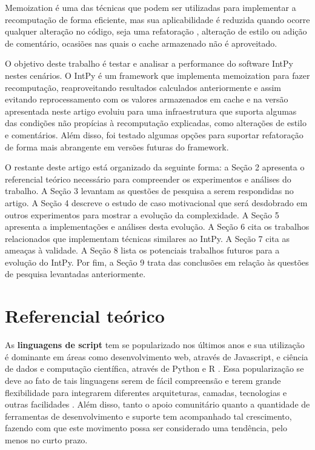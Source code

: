 \documentclass[sigconf]{acmart}
\begin{document}
Memoization \cite{michie1968memo} é uma das técnicas que podem ser utilizadas para implementar a recomputação de forma eficiente, mas sua aplicabilidade é reduzida quando ocorre qualquer alteração no código, seja uma refatoração \cite{fowler2018refactoring}, alteração de estilo ou adição de comentário, ocasiões nas quais o cache armazenado não é aproveitado.

O objetivo deste trabalho é testar e analisar a performance do software IntPy nestes cenários. O IntPy é um framework que implementa memoization para fazer recomputação, reaproveitando resultados calculados anteriormente e assim evitando reprocessamento com os valores armazenados em cache e na versão apresentada neste artigo evoluiu para uma infraestrutura que suporta algumas das condições não propícias à recomputação explicadas, como alterações de estilo e comentários. Além disso, foi testado algumas opções para suportar refatoração de forma mais abrangente em versões futuras do framework.

O restante deste artigo está organizado da seguinte forma: a Seção 2 apresenta o referencial teórico necessário para compreender os experimentos e análises do trabalho. A Seção 3 levantam as questões de pesquisa a serem respondidas no artigo. A Seção 4 descreve o estudo de caso motivacional que será desdobrado em outros experimentos para mostrar a evolução da complexidade. A Seção 5 apresenta a implementações e análises desta evolução. A Seção 6 cita os trabalhos relacionados que implementam técnicas similares ao IntPy. A Seção 7 cita as ameaças à validade. A Seção 8 lista os potenciais trabalhos futuros para a evolução do IntPy. Por fim, a Seção 9 trata das conclusões em relação às questões de pesquisa levantadas anteriormente.

\section{Referencial teórico}
As \textbf{linguagens de script} tem se popularizado nos últimos anos e sua utilização é dominante em áreas como desenvolvimento web, através de Javascript, e ciência de dados e computação científica, através de Python e R \cite{IEEESpectrum:2020}. Essa popularização se deve ao fato de tais linguagens serem de fácil compreensão e terem grande flexibilidade para integrarem diferentes arquiteturas, camadas, tecnologias e outras facilidades \cite{ousterhout1998scripting}. Além disso, tanto o apoio comunitário quanto a quantidade de ferramentas de desenvolvimento e suporte tem acompanhado tal crescimento, fazendo com que este movimento possa ser considerado uma tendência, pelo menos no curto prazo.
\end{document}
